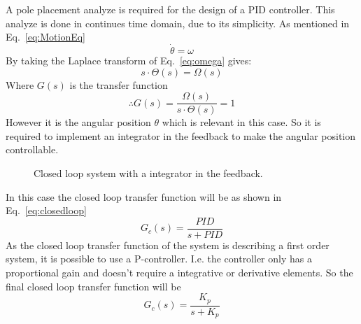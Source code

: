 A pole placement analyze is required for the design of a PID controller.
This analyze is done in continues time domain, due to its simplicity.
As mentioned in Eq.~\eqref{eq:MotionEq}
\begin{equation}
\dot{\theta} = \omega
\label{eq:omega}
\end{equation}
By taking the Laplace transform of Eq.~\eqref{eq:omega} gives:
\begin{equation}
s\cdot \Theta(s)= \Omega(s)
\end{equation}
Where $G(s)$ is the transfer function
\begin{equation}
\therefore G(s)=\frac{\Omega(s)}{s\cdot\Theta(s)} = 1
\end{equation}
However it is the angular position $\theta$ which is relevant in this case.
So it is required to implement an integrator in the feedback to make the angular position controllable.
\begin{figure}[h]
    \begin{center}
    \end{center}
    \caption{Closed loop system with a integrator in the feedback.}\label{fig:closedloop}
\end{figure}

In this case the closed loop transfer function will be as shown in Eq.~\eqref{eq:closedloop}
\begin{equation}
G_{c}(s) = \frac{PID}{s + PID}
\label{eq:closedloop}
\end{equation}
As the closed loop transfer function of the system is describing a first order system, it is possible to use a P-controller.
I.e. the controller only has a proportional gain and doesn't require a integrative or derivative elements.
So the final closed loop transfer function will be
\begin{equation}
G_{c}(s) = \frac{K_p}{s + K_p}
\label{eq:kp}
\end{equation}

